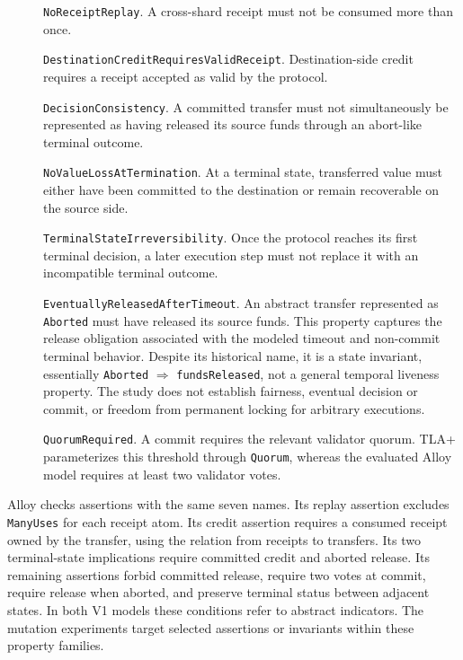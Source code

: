 \begin{description}

\item[] \texttt{NoReceipt\allowbreak Replay}.
A cross-shard receipt must not be consumed more than once.

\item[] \texttt{DestinationCreditRequires\allowbreak ValidReceipt}.
Destination-side credit requires a receipt accepted as valid by the protocol.

\item[] \texttt{Decision\allowbreak Consistency}.
A committed transfer must not simultaneously be represented as having released
its source funds through an abort-like terminal outcome.

\item[] \texttt{NoValueLossAt\allowbreak Termination}.
At a terminal state, transferred value must either have been committed to the
destination or remain recoverable on the source side.

\item[] \texttt{TerminalState\allowbreak Irreversibility}.
Once the protocol reaches its first terminal decision, a later execution step
must not replace it with an incompatible terminal outcome.

\item[] \texttt{EventuallyReleasedAfter\allowbreak Timeout}.
An abstract transfer represented as \texttt{Aborted} must have released its
source funds. This property captures the release obligation associated with the
modeled timeout and non-commit terminal behavior.
Despite its historical name, it is a state invariant, essentially
\texttt{Aborted} $\Rightarrow$ \texttt{fundsReleased}, not a general temporal
liveness property. The study does not establish fairness, eventual decision
or commit, or freedom from permanent locking for arbitrary executions.

\item[] \texttt{Quorum\allowbreak Required}.
A commit requires the relevant validator quorum. TLA+ parameterizes this
threshold through \texttt{Quorum}, whereas the evaluated Alloy model requires at
least two validator votes.

\end{description}

Alloy checks assertions with the same seven names. Its replay assertion
excludes \texttt{ManyUses} for each receipt atom. Its credit assertion
requires a consumed receipt owned by the transfer, using the relation from
receipts to transfers. Its two terminal-state implications require committed
credit and aborted release. Its remaining assertions forbid committed release,
require two votes at commit, require release when aborted, and preserve
terminal status between adjacent states. In both V1 models these conditions
refer to abstract indicators. The mutation experiments target selected
assertions or invariants within these property families.

